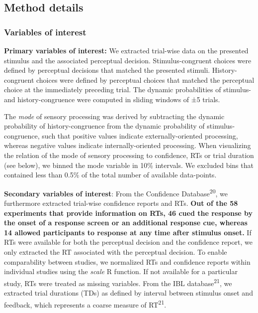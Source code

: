 \documentclass[
]{article}
\begin{document}
\hypertarget{method-details}{%
\subsection{Method details}\label{method-details}}

\hypertarget{variables-of-interest}{%
\subsubsection{Variables of interest}\label{variables-of-interest}}

\textbf{Primary variables of interest:} We extracted trial-wise data on
the presented stimulus and the associated perceptual decision.
Stimulus-congruent choices were defined by perceptual decisions that
matched the presented stimuli. History-congruent choices were defined by
perceptual choices that matched the perceptual choice at the immediately
preceding trial. The dynamic probabilities of stimulus- and
history-congruence were computed in sliding windows of ±5 trials.

The \emph{mode} of sensory processing was derived by subtracting the
dynamic probability of history-congruence from the dynamic probability
of stimulus-congruence, such that positive values indicate
externally-oriented processing, whereas negative values indicate
internally-oriented processing. When visualizing the relation of the
mode of sensory processing to confidence, RTs or trial duration (see
below), we binned the mode variable in 10\% intervals. We excluded bins
that contained less than 0.5\% of the total number of available
data-points.

\textbf{Secondary variables of interest}: From the Confidence
Database\textsuperscript{20}, we furthermore extracted trial-wise
confidence reports and RTs. \textbf{Out of the 58 experiments that
provide information on RTs, 46 cued the response by the onset of a
response screen or an additional response cue, whereas 14 allowed
participants to response at any time after stimulus onset.} If RTs were
available for both the perceptual decision and the confidence report, we
only extracted the RT associated with the perceptual decision. To enable
comparability between studies, we normalized RTs and confidence reports
within individual studies using the \emph{scale} R function. If not
available for a particular study, RTs were treated as missing variables.
From the IBL database\textsuperscript{21}, we extracted trial durations
(TDs) as defined by interval between stimulus onset and feedback, which
represents a coarse measure of RT\textsuperscript{21}.
\end{document}
